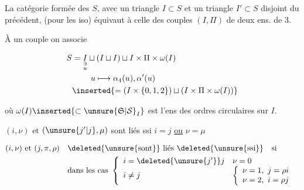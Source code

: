 
La catégorie formée des $S$, avec un triangle $I\subset S$ et un triangle $I'\subset S$ disjoint du précédent, (pour les iso) équivaut à celle des couples $(I,\Pi)$ de deux ens. de  3.

À un  couple on associe

\[
\begin{aligned}
S&=\underset{\substack{\ni\\u}}{I}
\sqcup(I\sqcup I)\sqcup I\times\Pi\times\omega(I)\\
&\hspace{8mm}u\longmapsto\alpha_4(u),\alpha'(u)\\
&\inserted{=(I\times\{0,1,2\})\sqcup(I\times\Pi\times\omega(I))}
\end{aligned}
\]

où $\omega(I)\inserted{\subset\unsure{\mathfrak S|\mathcal S}_I}$ est l'ens  des ordres circulaires sur $I$.



$(i,\nu)$ et $(\unsure{j'|j},\mu)$  sont liés ssi $i=j$ \uline{ou} $\nu=\mu$

\[
\begin{aligned}
(i,\nu)\text{ et }(j,\pi,\rho)\quad &\deleted{\unsure{\text{sont}}}\ \text{liés }\deleted{\unsure{\text{ssi}}}\quad\text{si}\\
&\text{dans les cas }\left\{\begin{array}{ll}
i=\deleted{\unsure{j'}}j &\nu=0\\
i\ne j&\left\{\begin{array}{l}\nu=1,\ j=\rho i\\ \nu=2,\ i=\rho j\end{array}\right.
\end{array}\right.
\end{aligned}
\]

